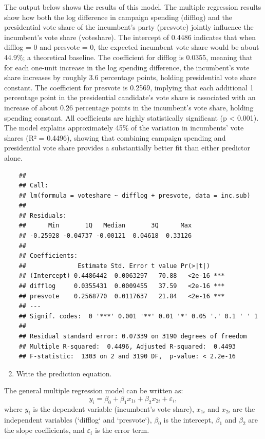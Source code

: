 \documentclass[
]{article}
\begin{document}
The output below shows the results of this model. The multiple regression results show how both the log difference in campaign spending (difflog) and the presidential vote share of the incumbent’s party (presvote) jointly influence the incumbent’s vote share (voteshare). The intercept of 0.4486 indicates that when difflog = 0 and presvote = 0, the expected incumbent vote share would be about 44.9\%; a theoretical baseline. The coefficient for difflog is 0.0355, meaning that for each one-unit increase in the log spending difference, the incumbent’s vote share increases by roughly 3.6 percentage points, holding presidential vote share constant. The coefficient for presvote is 0.2569, implying that each additional 1 percentage point in the presidential candidate’s vote share is associated with an increase of about 0.26 percentage points in the incumbent’s vote share, holding spending constant. All coefficients are highly statistically significant (p < 0.001). The model explains approximately 45\% of the variation in incumbents’ vote shares (R² = 0.4496), showing that combining campaign spending and presidential vote share provides a substantially better fit than either predictor alone.

\begin{verbatim}
	## 
	## Call:
	## lm(formula = voteshare ~ difflog + presvote, data = inc.sub)
	## 
	## Residuals:
	##      Min       1Q   Median       3Q      Max 
	## -0.25928 -0.04737 -0.00121  0.04618  0.33126 
	## 
	## Coefficients:
	##              Estimate Std. Error t value Pr(>|t|)    
	## (Intercept) 0.4486442  0.0063297   70.88   <2e-16 ***
	## difflog     0.0355431  0.0009455   37.59   <2e-16 ***
	## presvote    0.2568770  0.0117637   21.84   <2e-16 ***
	## ---
	## Signif. codes:  0 '***' 0.001 '**' 0.01 '*' 0.05 '.' 0.1 ' ' 1
	## 
	## Residual standard error: 0.07339 on 3190 degrees of freedom
	## Multiple R-squared:  0.4496, Adjusted R-squared:  0.4493 
	## F-statistic:  1303 on 2 and 3190 DF,  p-value: < 2.2e-16
\end{verbatim}
\vspace{.5cm}

\begin{enumerate}\setcounter{enumi}{1}
	\item Write the prediction equation.
\end{enumerate}

\noindent The general multiple regression model can be written as:
\[
y_i = \beta_0 + \beta_1 x_{1i} + \beta_2 x_{2i} + \varepsilon_i,
\]
where $y_i$ is the dependent variable (incumbent's vote share), $x_{1i}$ and $x_{2i}$ are the independent variables (`difflog` and `presvote`), $\beta_0$ is the intercept, $\beta_1$ and $\beta_2$ are the slope coefficients, and $\varepsilon_i$ is the error term.
\end{document}
